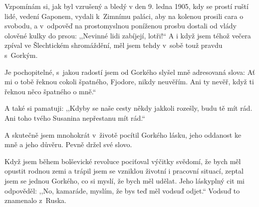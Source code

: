 Vzpomínám si, jak byl vzrušený a bledý v den 9. ledna 1905, kdy se prostí ruští lidé, vedení Gaponem, vydali k Zimnímu paláci, aby na kolenou prosili cara o svobodu, a v odpověď na prostomyslnou poníženou prosbu dostali od vlády olověné kulky do prsou: ,,Nevinné lidi zabíjejí, lotři!``
A i když jsem téhož večera zpíval ve Šlechtickém shromáždění, měl jsem tehdy v sobě touž pravdu s Gorkým. 

Je pochopitelné, s jakou radostí jsem od Gorkého slyšel mně adresovaná slova: Ať mi o tobě řeknou cokoli špatného, Fjodore, nikdy neuvěřím. Ani ty nevěř, když ti řeknou něco špatného o mně.`` 

A také si pamatuji: ,,Kdyby se naše cesty někdy jakkoli rozešly, budu tě mít rád. Ani toho tvého Susanina nepřestanu mít rád.``

A skutečně jsem mnohokrát v životě pocítil Gorkého lásku, jeho oddanost ke mně a jeho důvěru. Pevně držel své slovo.

Když jsem během bolševické revoluce pociťoval výčitky svědomí, že bych měl opustit rodnou zemi a trápil jsem se vzniklou životní i pracovní situací, zeptal jsem se jednou Gorkého, co si myslí, že bych měl udělat. Jeho láskyplný cit mi odpověděl: ,,No, kamaráde, myslím, že bys teď měl vodsuď odjet.`` Vodsuď to znamenalo z Ruska. 

